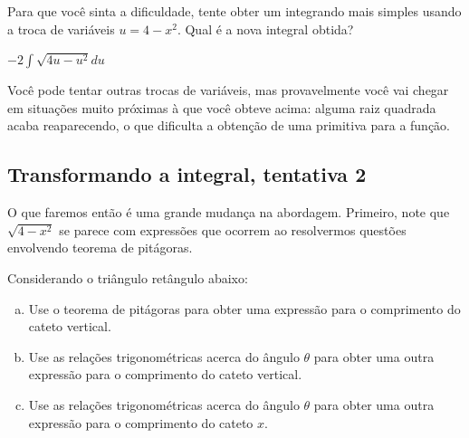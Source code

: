 \documentclass[main_estudante.tex]{subfiles}
\begin{document}

\begin{questao}
Para que você sinta a dificuldade, tente obter um integrando mais simples usando a troca de variáveis $u=4-x^2$. Qual é a nova integral obtida?
\end{questao}

\begin{gabarito}
	\begin{gabaritoQuestao}
		$-2\int\sqrt{4u-u^2}du$
	\end{gabaritoQuestao}
\end{gabarito}

Você pode tentar outras trocas de variáveis, mas provavelmente você vai chegar em situações muito próximas à que você obteve acima: alguma raiz quadrada acaba reaparecendo, o que dificulta a obtenção de uma primitiva para a função.

\subsection*{Transformando a integral, tentativa 2}

O que faremos então é uma grande mudança na abordagem. Primeiro, note que $\sqrt{4-x^2}$ se parece com expressões que ocorrem ao resolvermos questões envolvendo teorema de pitágoras.


\begin{questao}
Considerando o triângulo retângulo abaixo:
\begin{enumerate}[a)]
\item Use o teorema de pitágoras para obter uma expressão para o comprimento do cateto vertical.
\item Use as relações trigonométricas acerca do ângulo $\theta$ para obter uma outra expressão para o comprimento do cateto vertical.
\item Use as relações trigonométricas acerca do ângulo $\theta$ para obter uma outra expressão para o comprimento do cateto $x$.
\end{enumerate}
\end{questao}
\end{document}
